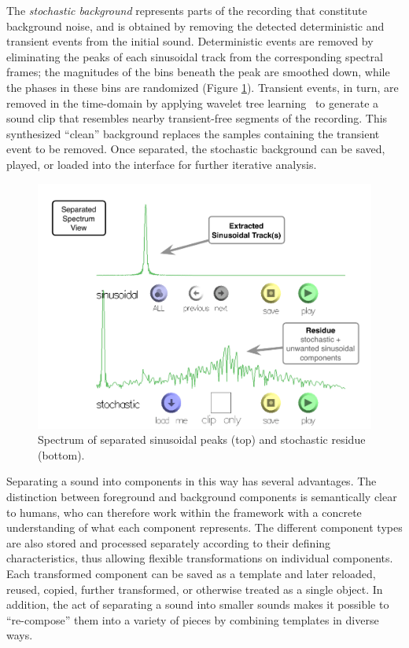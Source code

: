 \documentclass[10pt,letterpaper]{article}
\begin{document}
The \textit{stochastic background} represents parts of the recording
that constitute background noise, and is obtained by removing the
detected deterministic and transient events from the initial sound.
Deterministic events are removed by eliminating the peaks of each
sinusoidal track from the corresponding spectral frames; the magnitudes
of the bins beneath the peak are smoothed down, while the phases in
these bins are randomized (Figure \ref{fig:ui_separate}). Transient
events, in turn, are removed in the time-domain by applying wavelet tree
learning~ to generate a sound clip that resembles
nearby transient-free segments of the recording. This synthesized
``clean'' background replaces the samples containing the transient event
to be removed. Once separated, the stochastic background can be saved,
played, or loaded into the interface for further iterative analysis. 

\begin{figure}[h]
  \begin{center}
    \includegraphics[width=1\columnwidth]{ui_separate_w.pdf}
    \caption{Spectrum of separated sinusoidal peaks (top) and stochastic residue (bottom).} 
    \label{fig:ui_separate}
  \end{center}
\end{figure}

Separating a sound into components in this way has several advantages.
The distinction between foreground and background components is
semantically clear to humans, who can therefore work within the
framework with a concrete understanding of what each component
represents. The different component types are also stored and processed
separately according to their defining characteristics, thus allowing
flexible transformations on individual components. Each transformed
component can be saved as a template and later reloaded, reused, copied,
further transformed, or otherwise treated as a single object. In
addition, the act of separating a sound into smaller sounds makes it
possible to ``re-compose'' them into a variety of pieces by combining
templates in diverse ways.
\end{document}
